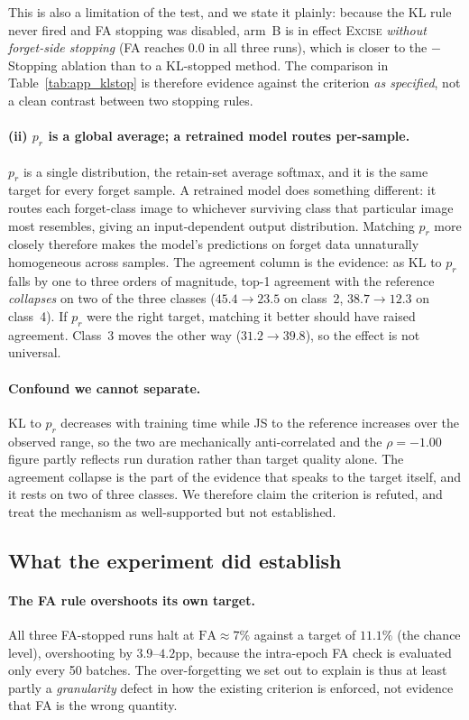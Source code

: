 \documentclass{article}
\newcommand{\ours}{\textsc{Excise}}
\newcommand{\KL}{\mathrm{KL}}
\theoremstyle{remark}
\theoremstyle{plain}
\begin{document}
This is also a limitation of the test, and we state it plainly: because the KL
rule never fired and FA stopping was disabled, arm~B is in effect \ours{}
\emph{without forget-side stopping} (FA reaches $0.0$ in all three runs), which
is closer to the $-$Stopping ablation than to a KL-stopped method. The
comparison in Table~\ref{tab:app_klstop} is therefore evidence against the
criterion \emph{as specified}, not a clean contrast between two stopping rules.

\paragraph{(ii) $p_r$ is a global average; a retrained model routes per-sample.}
$p_r$ is a single distribution, the retain-set average softmax, and it is the
same target for every forget sample. A retrained model does something different:
it routes each forget-class image to whichever surviving class that particular
image most resembles, giving an input-dependent output distribution. Matching
$p_r$ more closely therefore makes the model's predictions on forget data
unnaturally homogeneous across samples. The agreement column is the evidence:
as $\KL$ to $p_r$ falls by one to three orders of magnitude, top-1 agreement
with the reference \emph{collapses} on two of the three classes
($45.4 \to 23.5$ on class~2, $38.7 \to 12.3$ on class~4). If $p_r$ were the
right target, matching it better should have raised agreement. Class~3 moves the
other way ($31.2 \to 39.8$), so the effect is not universal.

\paragraph{Confound we cannot separate.}
$\KL$ to $p_r$ decreases with training time while JS to the reference increases
over the observed range, so the two are mechanically anti-correlated and the
$\rho = -1.00$ figure partly reflects run duration rather than target quality
alone. The agreement collapse is the part of the evidence that speaks to the
target itself, and it rests on two of three classes. We therefore claim the
criterion is refuted, and treat the mechanism as well-supported but not
established.

\subsection{What the experiment did establish}

\paragraph{The FA rule overshoots its own target.}
All three FA-stopped runs halt at $\mathrm{FA} \approx 7\%$ against a target of
$11.1\%$ (the chance level), overshooting by $3.9$--$4.2$pp, because the
intra-epoch FA check is evaluated only every 50 batches. The over-forgetting we
set out to explain is thus at least partly a \emph{granularity} defect in how
the existing criterion is enforced, not evidence that FA is the wrong quantity.
\end{document}
